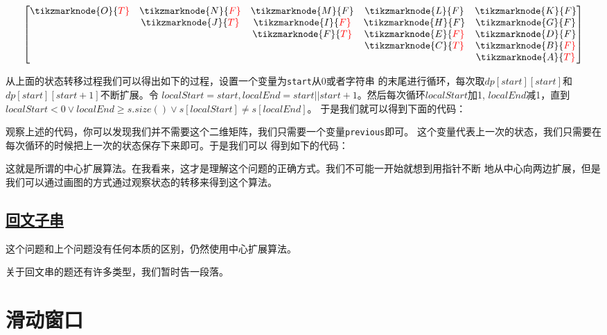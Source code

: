 \documentclass[../../main.tex]{subfiles}
\begin{document}
$$
\begin{bmatrix}
  \tikzmarknode{O}{\color{red}T} & \tikzmarknode{N}{\color{red}F} & \tikzmarknode{M}{F} & \tikzmarknode{L}{F} & \tikzmarknode{K}{F} \\
  & \tikzmarknode{J}{\color{red}T} & \tikzmarknode{I}{\color{red}F} & \tikzmarknode{H}{F} & \tikzmarknode{G}{F} \\
  &   & \tikzmarknode{F}{\color{red}T}& \tikzmarknode{E}{\color{red}F} & \tikzmarknode{D}{F} \\
  &   &   & \tikzmarknode{C}{\color{red}T} & \tikzmarknode{B}{\color{red}F} \\
  &   &   &   & \tikzmarknode{A}{\color{red}{T}}
\end{bmatrix}
$$


从上面的状态转移过程我们可以得出如下的过程，设置一个变量为\verb|start|从0或者字符串
的末尾进行循环，每次取$dp[start][start]$和$dp[start][start + 1]$不断扩展。令
$localStart = start, localEnd = start || start + 1$。然后每次循环$localStart$加1,
$localEnd$减1，直到$localStart < 0 \lor localEnd \geq s.size() \lor s[localStart] \neq s[localEnd]$。
于是我们就可以得到下面的代码：



观察上述的代码，你可以发现我们并不需要这个二维矩阵，我们只需要一个变量\verb|previous|即可。
这个变量代表上一次的状态，我们只需要在每次循环的时候把上一次的状态保存下来即可。于是我们可以
得到如下的代码：



这就是所谓的中心扩展算法。在我看来，这才是理解这个问题的正确方式。我们不可能一开始就想到用指针不断
地从中心向两边扩展，但是我们可以通过画图的方式通过观察状态的转移来得到这个算法。

\subsection{\href{https://leetcode-cn.com/problems/palindromic-substrings/}{回文子串}}

这个问题和上个问题没有任何本质的区别，仍然使用中心扩展算法。

\begin{kaobox}[title=小结]
  关于回文串的题还有许多类型，我们暂时告一段落。
\end{kaobox}

\section{滑动窗口}
\end{document}

